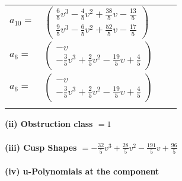 \documentclass[1p]{elsarticle_modified}
\theoremstyle{definition}
\begin{document}
\begin{tabular}{m{7pt} m{180pt} m{7pt} m{180pt} }
\flushright $a_{10}=$&$\begin{pmatrix}\frac{6}{5} v^3-\frac{4}{5} v^2+\frac{38}{5} v-\frac{13}{5}\\\frac{9}{5} v^3-\frac{6}{5} v^2+\frac{52}{5} v-\frac{17}{5}\end{pmatrix}$ \\
\flushright $a_{6}=$&$\begin{pmatrix}- v\\-\frac{3}{5} v^3+\frac{2}{5} v^2-\frac{19}{5} v+\frac{4}{5}\end{pmatrix}$\\ \flushright $a_{6}=$&$\begin{pmatrix}- v\\-\frac{3}{5} v^3+\frac{2}{5} v^2-\frac{19}{5} v+\frac{4}{5}\end{pmatrix}$\\&\end{tabular}
\flushleft \textbf{(ii) Obstruction class $= 1$}\\~\\
\flushleft \textbf{(iii) Cusp Shapes $= -\frac{32}{5} v^3+\frac{28}{5} v^2-\frac{191}{5} v+\frac{96}{5}$}\\~\\
\newpage\renewcommand{\arraystretch}{1}
\flushleft \textbf{(iv) u-Polynomials at the component}\newline \\
\end{document}
